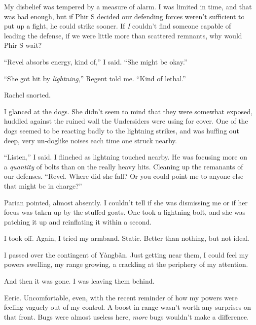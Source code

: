 My disbelief was tempered by a measure of alarm.  I was limited in time, and that was bad enough, but if Phir S decided our defending forces weren't sufficient to put up a fight, he could strike sooner.  If \emph{I} couldn't find someone capable of leading the defense, if we were little more than scattered remnants, why would Phir S wait?



``Revel absorbs energy, kind of,'' I said.  ``She might be okay.''



``She got hit by \emph{lightning},'' Regent told me.  ``Kind of lethal.''



Rachel snorted.



I glanced at the dogs.  She didn't seem to mind that they were somewhat exposed, huddled against the ruined wall the Undersiders were using for cover.  One of the dogs seemed to be reacting badly to the lightning strikes, and was huffing out deep, very un-doglike noises each time one struck nearby.



``Listen,'' I said.  I flinched as lightning touched nearby.  He was focusing more on a \emph{quantity} of bolts than on the really heavy hits.  Cleaning up the remanants of our defenses.  ``Revel.  Where did she fall?  Or you could point me to anyone else that might be in charge?''



Parian pointed, almost absently.  I couldn't tell if she was dismissing me or if her focus was taken up by the stuffed goats.  One took a lightning bolt, and she was patching it up and reinflating it within a second.



I took off.  Again, I tried my armband.  Static.  Better than nothing, but not ideal.



I passed over the contingent of Y\`{a}ngb\v{a}n.  Just getting near them, I could feel my powers swelling, my range growing, a crackling at the periphery of my attention.



And then it was gone.  I was leaving them behind.



Eerie.  Uncomfortable, even, with the recent reminder of how my powers were feeling vaguely out of my control.  A boost in range wasn't worth any surprises on that front.  Bugs were almost useless here, \emph{more} bugs wouldn't make a difference.



